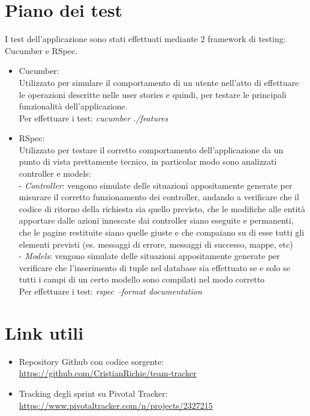 \documentclass[a4paper,12pt]{extarticle}
\begin{document}
\section{Piano dei test}
I test dell'applicazione sono stati effettuati mediante 2 framework di testing: Cucumber e RSpec.
\begin{itemize}
    \item Cucumber: \\
        Utilizzato per simulare il comportamento di un utente nell'atto di effettuare le operazioni
        descritte nelle user stories e quindi, per testare le principali funzionalità dell'applicazione. \\
        Per effettuare i test: \textit{cucumber ./features}
    \item RSpec: \\
        Utilizzato per testare il corretto comportamento dell'applicazione da un punto di vista prettamente tecnico, in particolar modo sono analizzati controller e models: \\ 
         - \textit{Controller}: vengono simulate delle situazioni appositamente generate per misurare il corretto
         funzionamento dei controller, andando a verificare che il codice di ritorno della richiesta sia quello
         previsto, che le modifiche alle entità apportare dalle azioni innescate dai controller siano eseguite e permanenti, che le pagine restituite siano quelle giuste e che compaiano su di esse tutti gli elementi 
         previsti (es. messaggi di errore, messaggi di successo, mappe, etc) \\ 
         - \textit{Models}: vengono simulate delle situazioni appositamente generate per verificare che l'inserimento
         di tuple nel database sia effettuato se e solo se tutti i campi di un certo modello sono compilati
         nel modo corretto \\
        Per effettuare i test: \textit{rspec --format documentation}
\end{itemize}

\section{Link utili}
\begin{itemize}
    \item Repository Github con codice sorgente: \\ \href{https://github.com/CristianRichie/team-tracker}{https://github.com/CristianRichie/team-tracker}
    \item Tracking degli sprint su Pivotal Tracker: \\ \href{https://www.pivotaltracker.com/n/projects/2327215}{https://www.pivotaltracker.com/n/projects/2327215}
\end{itemize}
\end{document}
